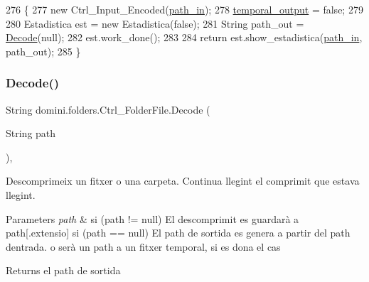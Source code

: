 \begin{DoxyCode}
276                            \{
277         \textcolor{keyword}{new} Ctrl\_Input\_Encoded(\hyperlink{classdomini_1_1folders_1_1Ctrl__FolderFile_a0d3946bb2832a1f34d0c2227df5c71c4}{path\_in});
278         \hyperlink{classdomini_1_1folders_1_1Ctrl__FolderFile_a0db81590abe27b21a9b8c37633c86fa6}{temporal\_output} = \textcolor{keyword}{false};
279 
280         Estadistica est = \textcolor{keyword}{new} Estadistica(\textcolor{keyword}{false});
281         String path\_out = \hyperlink{classdomini_1_1folders_1_1Ctrl__FolderFile_a5d28ac7f5223ecd40a242148e86447c1}{Decode}(null);
282         est.work\_done();
283 
284         \textcolor{keywordflow}{return} est.show\_estadistica(\hyperlink{classdomini_1_1folders_1_1Ctrl__FolderFile_a0d3946bb2832a1f34d0c2227df5c71c4}{path\_in}, path\_out);
285     \}
\end{DoxyCode}
\mbox{\label{classdomini_1_1folders_1_1Ctrl__FolderFile_ababd536f11319589ce3c371e3701afc6}} 
\subsubsection{\texorpdfstring{Decode()}{Decode()}\hspace{0.1cm}{\footnotesize\ttfamily [2/2]}}
{\footnotesize\ttfamily String domini.\+folders.\+Ctrl\+\_\+\+Folder\+File.\+Decode (\begin{DoxyParamCaption}\item[{String}]{path }\end{DoxyParamCaption})\hspace{0.3cm}{\ttfamily [inline]}, {\ttfamily [private]}}



Descomprimeix un fitxer o una carpeta. Continua llegint el comprimit que estava llegint. 


\begin{DoxyParams}{Parameters}
{\em path} & si (path != null) El descomprimit es guardarà a path\mbox{[}.extensio\mbox{]} si (path == null) El path de sortida es genera a partir del path d\textquotesingle{}entrada. o serà un path a un fitxer temporal, si es dona el cas \\
\hline
\end{DoxyParams}
\begin{DoxyReturn}{Returns}
el path de sortida 
\end{DoxyReturn}

